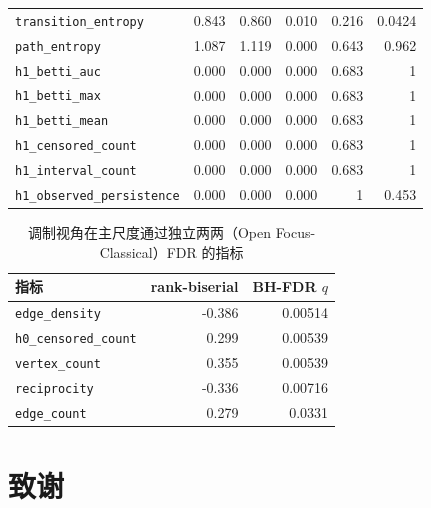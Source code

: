 \documentclass{article}
\begin{document}
\begin{table}[htbp]
\begin{tabular}{lrrrrr}
\rowcolor{orange!15}\verb|transition_entropy|      &            0.843 &             0.860 &        0.010 &     0.216 &    0.0424 \\
\verb|path_entropy|            &            1.087 &             1.119 &        0.000 &     0.643 &     0.962 \\
\verb|h1_betti_auc|            &            0.000 &             0.000 &        0.000 &     0.683 &         1 \\
\verb|h1_betti_max|            &            0.000 &             0.000 &        0.000 &     0.683 &         1 \\
\verb|h1_betti_mean|           &            0.000 &             0.000 &        0.000 &     0.683 &         1 \\
\verb|h1_censored_count|       &            0.000 &             0.000 &        0.000 &     0.683 &         1 \\
\verb|h1_interval_count|       &            0.000 &             0.000 &        0.000 &     0.683 &         1 \\
\verb|h1_observed_persistence| &            0.000 &             0.000 &        0.000 &         1 &     0.453 \\
\bottomrule
\end{tabular}
\end{table}

\vspace{2em}

\begin{table}[h]
\centering
\caption{调制视角在主尺度通过独立两两（Open Focus-Classical）FDR 的指标}
\label{tab:modulation_rank_biserial}
\begin{tabular}{lrr}
\toprule
指标 & rank-biserial & BH-FDR $q$ \\
\midrule
\verb|edge_density| & -0.386 & 0.00514 \\
\verb|h0_censored_count| & 0.299 & 0.00539 \\
\verb|vertex_count| & 0.355 & 0.00539 \\
\verb|reciprocity| & -0.336 & 0.00716 \\
\verb|edge_count| & 0.279 & 0.0331 \\
\bottomrule
\end{tabular}
\end{table}

\clearpage

\section{致谢}
\end{document}
